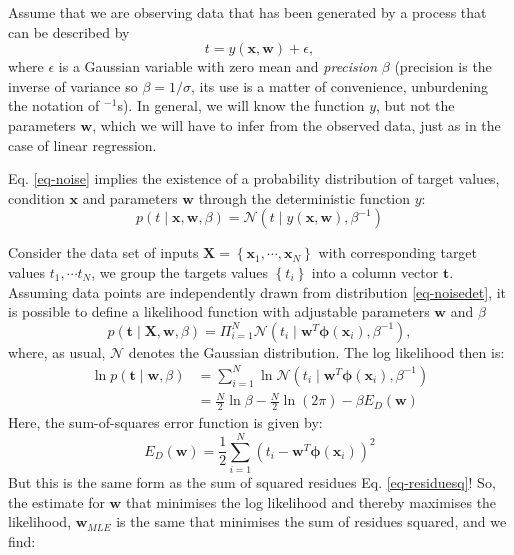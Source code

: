   Assume that we are observing data that has been generated by a process that can be described by
  \begin{equation}
    t = y (\boldsymbol{x}, \boldsymbol{w}) + \epsilon,
    \label{eq-noise}
  \end{equation}
  where $\epsilon$ is a Gaussian variable with zero mean and \emph{precision} $\beta$ (precision is the inverse of variance so $\beta = 1/\sigma$, its use is a matter of convenience, unburdening the notation of $^{-1}$s).
    In general, we will know the function $y$, but not the parameters $\boldsymbol{w}$, which we will  have to infer from the observed data, just as in the case of
    linear regression.  

    Eq. \ref{eq-noise} implies the existence of a probability distribution of target values, condition $\boldsymbol{x}$ and parameters $\boldsymbol{w}$
    through the deterministic function $y$:
    \begin{equation}
      p(t \mid \boldsymbol{x}, \boldsymbol{w}, \beta) = \mathcal{N}(t \mid y(\boldsymbol{x}, \boldsymbol{w}), \beta^{-1} )
        \label{eq-noisedet}
    \end{equation}

    Consider the data set of inputs $\boldsymbol{X} = \left\{ \boldsymbol{x}_1, \cdots, \boldsymbol{x}_N \right\}$ with corresponding target values $t_1, \cdots t_N$,
    we group the targets values $\left\{ t_i \right \}$ into a column vector $\boldsymbol{t}$. Assuming data points are independently drawn from distribution
    \ref{eq-noisedet}, it is possible to define a likelihood function with adjustable parameters $\boldsymbol{w}$ and $\beta$
    \begin{equation}
      p(\boldsymbol{t} \mid \boldsymbol{X}, \boldsymbol{w}, \beta) = \Pi^{N}_{i=1} \mathcal{N}(t_i \mid \boldsymbol{w}^T \boldsymbol{\phi}(\boldsymbol{x}_i), \beta^{-1}),
      \label{eq-gaussllh}
    \end{equation}
    where, as usual, $\mathcal{N}$ denotes the Gaussian distribution.
    The log likelihood then is:
    \begin{align}
      \ln p(\boldsymbol{t} \mid \boldsymbol{w}, \beta ) & = \sum^N_{i=1} \ln \mathcal{N}(t_i \mid \boldsymbol{w}^T \boldsymbol{\phi}(\boldsymbol{x}_i),\beta^{-1}) \nonumber \\
      & = \frac{N}{2} \ln \beta - \frac{N}{2} \ln ( 2 \pi ) - \beta E_{D}(\boldsymbol{w})
    \end{align}
    Here, the sum-of-squares error function is given by:
    \begin{equation}
      E_D(\boldsymbol{w}) = \frac{1}{2} \sum^N_{i=1}(t_i - \boldsymbol{w}^T \boldsymbol{\phi}(\boldsymbol{x}_i))^2
    \end{equation}
    But this is the same form as the sum of squared residues Eq. \ref{eq-residuesq}! So, the estimate for $\boldsymbol{w}$ that minimises the log likelihood and thereby
    maximises the likelihood, $\boldsymbol{w}_{MLE}$ is the same that minimises the
    sum of residues squared, and we find:

